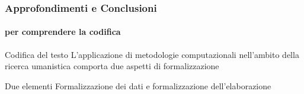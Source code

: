 










\begin{frame}
	\frametitle{Approfondimenti e Conclusioni}
	\framesubtitle{per comprendere la codifica}
	\addtocounter{nframe}{1}

	\begin{block}{Codifica del testo}
		L’applicazione di metodologie computazionali nell’ambito della ricerca umanistica comporta due aspetti di formalizzazione
	\end{block}

	\begin{block}{Due elementi}
		Formalizzazione dei dati e formalizzazione dell'elaborazione
	\end{block}

\end{frame}

